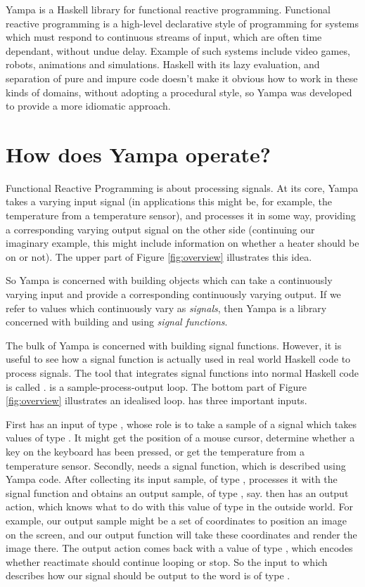 Yampa is a Haskell library for functional reactive programming. Functional reactive programming is a high-level declarative style of programming for systems which must respond to continuous streams of input, which are often time dependant, without undue delay. Example of such systems include video games, robots, animations and simulations. Haskell with its lazy evaluation, and separation of pure and impure code doesn't make it obvious how to work in these kinds of domains, without adopting a procedural style, so Yampa was developed to provide a more idiomatic approach.

\section{How does Yampa operate?}

Functional Reactive Programming is about processing signals. At its core, Yampa takes a varying input signal (in applications this might be, for example, the temperature from a temperature sensor), and processes it in some way, providing a corresponding varying output signal on the other side (continuing our imaginary example, this might include information on whether a heater should be on or not). The upper part of Figure \ref{fig:overview} illustrates this idea.

So Yampa is concerned with building objects which can take a continuously varying input and provide a corresponding continuously varying output. If we refer to values which continuously vary as \emph{signals}, then Yampa is a library concerned with building and using \emph{signal functions}.

The bulk of Yampa is concerned with building signal functions. However, it is useful to see how a signal function is actually used in real world Haskell code to process signals. The tool that integrates signal functions into normal Haskell code is called .  is a sample-process-output loop. The bottom part of Figure \ref{fig:overview} illustrates an idealised loop.  has three important inputs.

First  has an input of type , whose role is to take a sample of a signal which takes values of type . It might get the position of a mouse cursor, determine whether a key on the keyboard has been pressed, or get the temperature from a temperature sensor. Secondly,  needs a signal function, which is described using Yampa code. After collecting its input sample, of type ,  processes it with the signal function and obtains an output sample, of type , say.  then has an output action, which knows what to do with this value of type  in the outside world. For example, our output sample might be a set of coordinates to position an image on the screen, and our output function will take these coordinates and render the image there. The output  action comes back with a value of type , which encodes whether reactimate should continue looping or stop. So the input to  which describes how our signal should be output to the word is of type .


